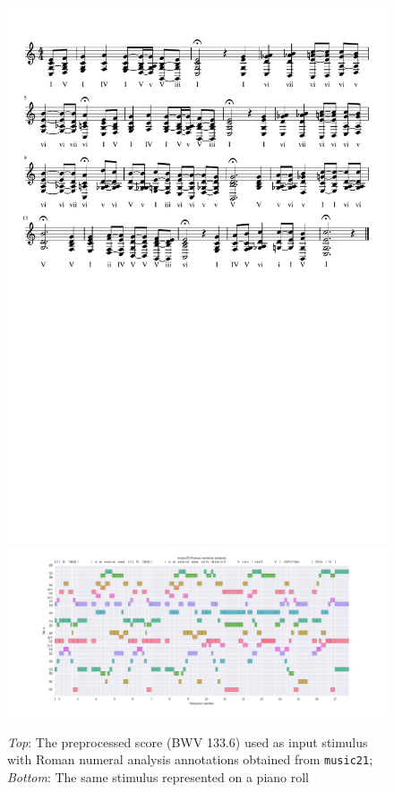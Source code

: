 \documentclass[dissertation.tex]{subfiles}
\begin{document}
\begin{figure}[htpb]
    \centering
    \includegraphics[trim={0 15cm 0 0},clip,width=0.9\linewidth]{Figures/model-analysis-input-score.pdf}
    \includegraphics[width=1.00\linewidth]{Figures/model-analysis-input-piano-roll.png}
    \caption{{\it Top}: The preprocessed score (BWV 133.6) used as input stimulus with Roman numeral analysis annotations obtained
        from {\tt music21}; {\it Bottom}: The same stimulus represented on a piano roll}
    \label{fig:model-analysis-stimulus}
\end{figure}
\end{document}
